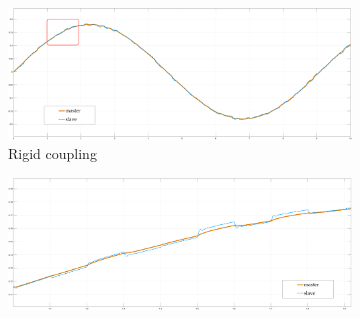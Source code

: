 \begin{figure}
	\begin{subfigure}[h!]{1\linewidth}
		\centering
		\includegraphics[width=\textwidth, height=\textwidth/4]{Images/freerigidTot20HtznoiseRect}
		\caption{ Rigid coupling }
		\label{fig:freeRigTot20HR}
	\end{subfigure}	
  \newline
	\begin{subfigure}[h!]{1\linewidth}
		\centering
		\includegraphics[width=\textwidth, height=\textwidth/4]{Images/freerigidPart20Htznoise}

\end{subfigure}
\end{figure}
